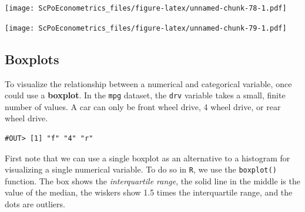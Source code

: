 \documentclass[]{book}
\newenvironment{Shaded}{\begin{snugshade}}{\end{snugshade}}
\newcommand{\KeywordTok}[1]{\textcolor[rgb]{0.13,0.29,0.53}{\textbf{#1}}}
\newcommand{\DataTypeTok}[1]{\textcolor[rgb]{0.13,0.29,0.53}{#1}}
\newcommand{\StringTok}[1]{\textcolor[rgb]{0.31,0.60,0.02}{#1}}
\newcommand{\OperatorTok}[1]{\textcolor[rgb]{0.81,0.36,0.00}{\textbf{#1}}}
\newcommand{\NormalTok}[1]{#1}
\theoremstyle{definition}
\theoremstyle{definition}
\theoremstyle{definition}
\theoremstyle{remark}
\begin{document}
\begin{Shaded}
\end{Shaded}

\texttt{[image: ScPoEconometrics\_files/figure-latex/unnamed-chunk-78-1.pdf]}

\begin{Shaded}
\end{Shaded}

\texttt{[image: ScPoEconometrics\_files/figure-latex/unnamed-chunk-79-1.pdf]}

\subsection{Boxplots}\label{boxplots}

To visualize the relationship between a numerical and categorical
variable, once could use a \textbf{boxplot}. In the \texttt{mpg}
dataset, the \texttt{drv} variable takes a small, finite number of
values. A car can only be front wheel drive, 4 wheel drive, or rear
wheel drive.

\begin{Shaded}
\end{Shaded}

\begin{verbatim}
#OUT> [1] "f" "4" "r"
\end{verbatim}

First note that we can use a single boxplot as an alternative to a
histogram for visualizing a single numerical variable. To do so in
\texttt{R}, we use the \texttt{boxplot()} function. The box shows the
\emph{interquartile range}, the solid line in the middle is the value of
the median, the wiskers show 1.5 times the interquartile range, and the
dots are outliers.
\end{document}

